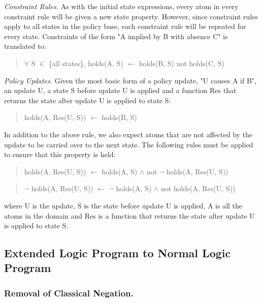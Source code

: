 \documentclass{llncs}
\begin{document}
        \emph{Constraint Rules.} As with the initial state expressions, every
        atom in every constraint rule will be given a new state property.
        However, since constraint rules apply to all states in the policy
        base, each constraint rule will be repeated for every state.
        Constraints of the form "A implied by B with absence C" is translated
        to:

        \begin{quote}
          $\forall$ S $\in$ \{all states\},
          holds(A, S) $\leftarrow$ holds(B, S) not holds(C, S)
        \end{quote}

        \emph{Policy Updates.} Given the most basic form of a policy update,
        "U causes A if B", an update U, a state S before update U is applied
        and a function Res that returns the state after update U is applied
        to state S:

        \begin{quote}
          holds(A, Res(U, S)) $\leftarrow$ holds(B, S)
        \end{quote}
 
        In addition to the above rule, we also expect atoms that are not
        affected by the update to be carried over to the next state. The 
        following rules must be applied to ensure that this property is
        held:

        \begin{quote}
          holds(A, Res(U, S)) $\leftarrow$ holds(A, S) $\land$ not $\lnot$
          holds(A, Res(U, S))
        \end{quote}
        \begin{quote}
          $\lnot$ holds(A, Res(U, S)) $\leftarrow$ $\lnot$ holds(A, S) $\land$
          not holds(A, Res(U, S))
        \end{quote}

        where U is the update, S is the state before update U is applied, A is 
        all the atoms in the domain and Res is a function that returns the
        state after update U is applied to state S.

    \subsection{Extended Logic Program to Normal Logic Program}

      \subsubsection{Removal of Classical Negation.}
\end{document}

